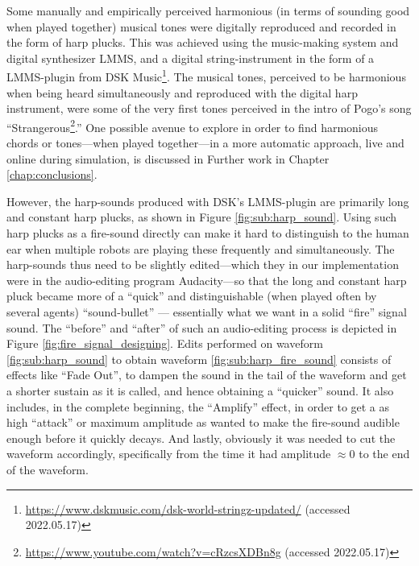 			Some manually and empirically perceived harmonious (in terms of sounding good when played together) musical tones were digitally reproduced and recorded in the form of harp plucks. This was achieved using the music-making system and digital synthesizer LMMS, and a digital string-instrument in the form of a LMMS-plugin from DSK Music\footnote{\url{https://www.dskmusic.com/dsk-world-stringz-updated/} (accessed 2022.05.17)}. The musical tones, perceived to be harmonious when being heard simultaneously and reproduced with the digital harp instrument, were some of the very first tones perceived in the intro of Pogo's song ``Strangerous\footnote{\url{https://www.youtube.com/watch?v=cRzcsXDBn8g} (accessed 2022.05.17)}.'' One possible avenue to explore in order to find harmonious chords or tones—when played together—in a more automatic approach, live and online during simulation, is discussed in Further work in Chapter \ref{chap:conclusions}.
			
			However, the harp-sounds produced with DSK's LMMS-plugin are primarily long and constant harp plucks, as shown in Figure \ref{fig:sub:harp_sound}. Using such harp plucks as a fire-sound directly can make it hard to distinguish to the human ear when multiple robots are playing these frequently and simultaneously. The harp-sounds thus need to be slightly edited—which they in our implementation were in the audio-editing program Audacity—so that the long and constant harp pluck became more of a ``quick'' and distinguishable (when played often by several agents) ``sound-bullet'' — essentially what we want in a solid ``fire'' signal sound. The ``before'' and ``after'' of such an audio-editing process is depicted in Figure \ref{fig:fire_signal_designing}. Edits performed on waveform \ref{fig:sub:harp_sound} to obtain waveform \ref{fig:sub:harp_fire_sound} consists of effects like ``Fade Out'', to dampen the sound in the tail of the waveform and get a shorter sustain as it is called, and hence obtaining a ``quicker'' sound. It also includes, in the complete beginning, the ``Amplify'' effect, in order to get a as high ``attack'' or maximum amplitude as wanted to make the fire-sound audible enough before it quickly decays. And lastly, obviously it was needed to cut the waveform accordingly, specifically from the time it had amplitude $\approx 0$ to the end of the waveform.

